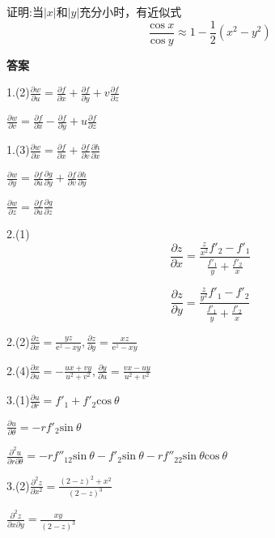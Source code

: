 \documentclass{ctexart}
\begin{document}
\noindent 证明:当$|x|$和$|y|$充分小时，有近似式$$\frac{\mathrm{cos}\ x}{\mathrm{cos}\ y}\approx 1-\frac{1}{2}(x^{2}-y^{2})$$


\textbf{答案}

1.(2)$\frac{\partial w}{\partial u}=\frac{\partial f}{\partial x}+\frac{\partial f}{\partial y}+v\frac{\partial f}{\partial z}$

$\frac{\partial w}{\partial v}=\frac{\partial f}{\partial x}-\frac{\partial f}{\partial y}+u\frac{\partial f}{\partial z}$

1.(3)$\frac{\partial w}{\partial x}=\frac{\partial f}{\partial x}+\frac{\partial f}{\partial v}\frac{\partial h}{\partial x}$

$\frac{\partial w}{\partial y}=\frac{\partial f}{\partial u}\frac{\partial g}{\partial y}+\frac{\partial f}{\partial v}\frac{\partial h}{\partial y}$

$\frac{\partial w}{\partial z}=\frac{\partial f}{\partial u}\frac{\partial g}{\partial z}$

2.(1)$$\frac{\partial z}{\partial x}=\frac{\frac{z}{x^{2}}f'_{2}-f'_{1}}{\frac{f'_{1}}{y}+\frac{f'_{2}}{x}}$$

$$\frac{\partial z}{\partial y}=\frac{\frac{z}{y^{2}}f'_{1}-f'_{2}}{\frac{f'_{1}}{y}+\frac{f'_{2}}{x}}$$

2.(2)$\frac{\partial z}{\partial x}=\frac{yz}{\mathrm{e}^{z}-xy},\frac{\partial z}{\partial y}=\frac{xz}{\mathrm{e}^{z}-xy}$

2.(4)$\frac{\partial x}{\partial u}=-\frac{ux+vy}{u^{2}+v^{2}},\frac{\partial y}{\partial u}=\frac{vx-uy}{u^{2}+v^{2}}$

3.(1)$\frac{\partial u}{\partial r}=f'_{1}+f'_{2}\mathrm{cos}\ \theta$

$\frac{\partial u}{\partial \theta}=-rf'_{2}\mathrm{sin}\ \theta$

$\frac{\partial^{2} u}{\partial r\partial \theta}=-rf''_{12}\mathrm{sin}\ \theta-f'_{2}\mathrm{sin}\ \theta-rf''_{22}\mathrm{sin}\ \theta\mathrm{cos}\ \theta$

3.(2)$\frac{\partial^{2} z}{\partial x^{2}}=\frac{(2-z)^{2}+x^{2}}{(2-z)^{3}}$

$\frac{\partial^{2} z}{\partial x\partial y}=\frac{xy}{(2-z)^{3}}$
\end{document}
